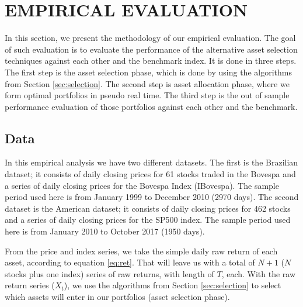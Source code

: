 \documentclass[12pt,oneside,a4paper]{memoir}
\begin{document}
\section{EMPIRICAL EVALUATION} \label{sec:experiment:it}

In this section, we present the methodology of our empirical evaluation.
The goal of such evaluation is to evaluate the performance of the alternative asset selection techniques against each other and the benchmark index.
It is done in three steps.
The first step is the asset selection phase, which is done by using the algorithms from Section \ref{sec:selection}.
The second step is asset allocation phase, where we form optimal portfolios in pseudo real time.
The third step is the out of sample performance evaluation of those portfolios against each other and the benchmark.

\subsection{Data} \label{sec:data}

In this empirical analysis we have two different datasets.
The first is the Brazilian dataset; it consists of daily closing prices for 61 stocks traded in the Bovespa and a series of daily closing prices for the Bovespa Index (IBovespa).
The sample period used here is from January 1999 to December 2010 (2970 days).
The second dataset is the American dataset; it consists of daily closing prices for 462 stocks and a series of daily closing prices for the SP500 index.
The sample period used here is from January 2010 to October 2017 (1950 days).

From the price and index series, we take the simple daily raw return of each asset, according to equation \eqref{eq:ret}.
That will leave us with a total of $N+1$ ($N$ stocks plus one index) series of raw returns, with length of $T$, each.
With the raw return series ($X_{t}$), we use the algorithms from Section \ref{sec:selection} to select which assets will enter in our portfolios (asset selection phase).

\end{document}
